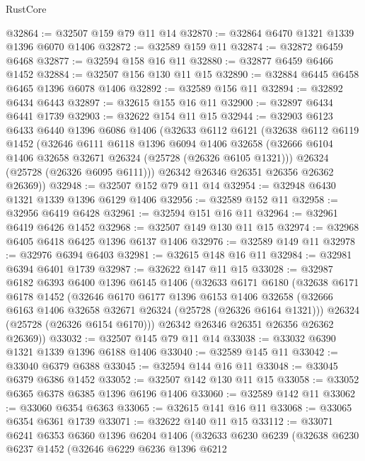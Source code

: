 \begin{lexlean}{RustCore}
\begin{coremodule}
@32864 := @32507 @159 @79 @11 @14
@32870 := @32864 @6470 @1321 @1339 @1396 @6070 @1406
@32872 := @32589 @159 @11
@32874 := @32872 @6459 @6468
@32877 := @32594 @158 @16 @11
@32880 := @32877 @6459 @6466 @1452
@32884 := @32507 @156 @130 @11 @15
@32890 := @32884 @6445 @6458 @6465 @1396 @6078 @1406
@32892 := @32589 @156 @11
@32894 := @32892 @6434 @6443
@32897 := @32615 @155 @16 @11
@32900 := @32897 @6434 @6441 @1739
@32903 := @32622 @154 @11 @15
@32944 := @32903
    @6123
    @6433
    @6440
    @1396
    @6086
    @1406
    (@32633
      @6112
      @6121
      (@32638
        @6112
        @6119
        @1452
        (@32646
          @6111
          @6118
          @1396
          @6094
          @1406
          @32658
          (@32666 @6104 @1406 @32658 @32671 @26324 (@25728 (@26326 @6105 @1321)))
          @26324
          (@25728 (@26326 @6095 @6111)))
        @26342
        @26346
        @26351
        @26356
        @26362
        @26369))
@32948 := @32507 @152 @79 @11 @14
@32954 := @32948 @6430 @1321 @1339 @1396 @6129 @1406
@32956 := @32589 @152 @11
@32958 := @32956 @6419 @6428
@32961 := @32594 @151 @16 @11
@32964 := @32961 @6419 @6426 @1452
@32968 := @32507 @149 @130 @11 @15
@32974 := @32968 @6405 @6418 @6425 @1396 @6137 @1406
@32976 := @32589 @149 @11
@32978 := @32976 @6394 @6403
@32981 := @32615 @148 @16 @11
@32984 := @32981 @6394 @6401 @1739
@32987 := @32622 @147 @11 @15
@33028 := @32987
    @6182
    @6393
    @6400
    @1396
    @6145
    @1406
    (@32633
      @6171
      @6180
      (@32638
        @6171
        @6178
        @1452
        (@32646
          @6170
          @6177
          @1396
          @6153
          @1406
          @32658
          (@32666 @6163 @1406 @32658 @32671 @26324 (@25728 (@26326 @6164 @1321)))
          @26324
          (@25728 (@26326 @6154 @6170)))
        @26342
        @26346
        @26351
        @26356
        @26362
        @26369))
@33032 := @32507 @145 @79 @11 @14
@33038 := @33032 @6390 @1321 @1339 @1396 @6188 @1406
@33040 := @32589 @145 @11
@33042 := @33040 @6379 @6388
@33045 := @32594 @144 @16 @11
@33048 := @33045 @6379 @6386 @1452
@33052 := @32507 @142 @130 @11 @15
@33058 := @33052 @6365 @6378 @6385 @1396 @6196 @1406
@33060 := @32589 @142 @11
@33062 := @33060 @6354 @6363
@33065 := @32615 @141 @16 @11
@33068 := @33065 @6354 @6361 @1739
@33071 := @32622 @140 @11 @15
@33112 := @33071
    @6241
    @6353
    @6360
    @1396
    @6204
    @1406
    (@32633
      @6230
      @6239
      (@32638
        @6230
        @6237
        @1452
        (@32646
          @6229
          @6236
          @1396
          @6212

\end{coremodule}
\end{lexlean}
